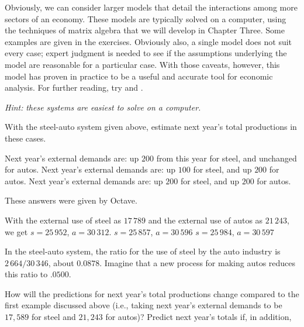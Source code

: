 Obviously, we can consider larger models that detail the interactions 
among more sectors of an economy.
These models are typically solved on a computer, using the techniques
of matrix algebra that we will develop in Chapter Three.
Some examples are given in the exercises.
Obviously also, a single model does not suit every case; expert
judgment is needed to see if the assumptions underlying the model
are reasonable for a particular case.
With those caveats,
however, this model has proven in practice to be a useful and accurate tool for
economic analysis.
For further reading, try \cite{Leontief1951} and \cite{Leontief1965}. 


\begin{exercises}
  \item[\textit{Hint:}]  
    \textit{these systems are easiest to solve on a computer.}
  \item 
    With the steel-auto system given above, estimate next year's
    total productions in these cases.
    \begin{exparts}
      \partsitem Next year's external demands are: up $200$ from this
         year for steel, and unchanged for autos.
      \partsitem Next year's external demands are: up $100$ for steel, and
         up $200$ for autos.
      \partsitem Next year's external demands are: up $200$ for steel, and
         up $200$ for autos.
    \end{exparts} 
    \begin{answer}
      These answers were given by Octave.
      \begin{exparts}
        \partsitem With the external use of steel as $17\,789$ and the 
          external use of autos as $21\,243$, we get $s=25\,952$, $a=30\,312$.
        \partsitem $s=25\,857$, $a=30\,596$
        \partsitem $s=25\,984$, $a=30\,597$
      \end{exparts}
    \end{answer}
  \item 
    In the steel-auto system, the ratio for the use of steel by the auto
    industry is $2\,664/30\,346$, about $0.0878$.
    Imagine that a new process for making autos reduces this 
    ratio to $.0500$.
    \begin{exparts}
      \partsitem How will the predictions for next year's total
        productions change compared to the first example discussed
        above (i.e., taking next year's external demands to be
        $17,589$ for steel and $21,243$ for autos)?
      \partsitem Predict next year's totals if, in addition,

\end{exparts}
\end{exercises}
